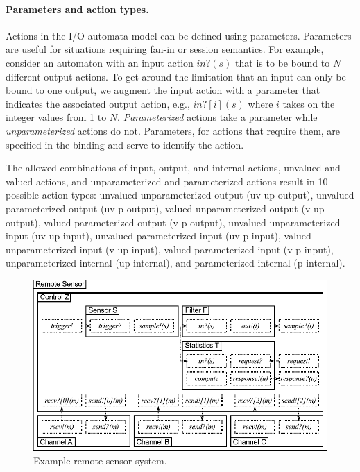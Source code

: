 \paragraph{Parameters and action types.}
Actions in the I/O automata model can be defined using parameters.
Parameters are useful for situations requiring fan-in or session semantics.
For example, consider an automaton with an input action $in?(s)$ that is to be bound to $N$ different output actions.
To get around the limitation that an input can only be bound to one output, we augment the input action with a parameter that indicates the associated output action, e.g., $in?[i](s)$ where $i$ takes on the integer values from 1 to $N$.
\emph{Parameterized} actions take a parameter while \emph{unparameterized} actions do not.
Parameters, for actions that require them, are specified in the binding and serve to identify the action.

The allowed combinations of input, output, and internal actions, unvalued and valued actions, and unparameterized and parameterized actions result in 10 possible action types:
unvalued unparameterized output (uv-up output),
unvalued parameterized output (uv-p output),
valued unparameterized output (v-up output),
valued parameterized output (v-p output),
unvalued unparameterized input (uv-up input),
unvalued parameterized input (uv-p input),
valued unparameterized input (v-up input),
valued parameterized input (v-p input),
unparameterized internal (up internal), and
parameterized internal (p internal).

\begin{figure}
\center
\includegraphics[width=\textwidth]{example1}
\caption{Example remote sensor system.}
\label{example1}
\end{figure}

